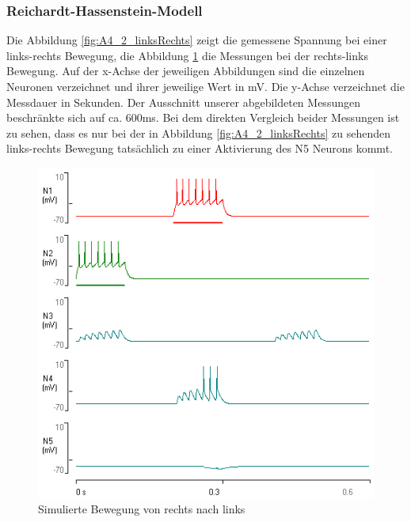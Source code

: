 \documentclass[a4paper]{article}
\begin{document}
\subsubsection{Reichardt-Hassenstein-Modell}
Die Abbildung \ref{fig:A4_2_linksRechts} zeigt die gemessene Spannung bei einer links-rechts Bewegung, die Abbildung \ref{fig:A4_2_rechtsLinks} die Messungen bei der rechts-links Bewegung. Auf der x-Achse der jeweiligen Abbildungen sind die einzelnen Neuronen verzeichnet und ihrer jeweilige Wert in mV. Die y-Achse verzeichnet die Messdauer in Sekunden. Der Ausschnitt unserer abgebildeten Messungen beschränkte sich auf ca. 600ms. Bei dem direkten Vergleich beider Messungen ist zu sehen, dass es nur bei der in Abbildung \ref{fig:A4_2_linksRechts} zu sehenden links-rechts Bewegung tatsächlich zu einer Aktivierung des N5 Neurons kommt. 
\vspace{2.0\baselineskip}
\begin{figure}[H]
    \centering
    \includegraphics[scale=0.7]{images/Aufgabe4_2_rechtsLinks.png}
    \caption{Simulierte Bewegung von rechts nach links}
    \label{fig:A4_2_rechtsLinks}
\end{figure}
\end{document}
